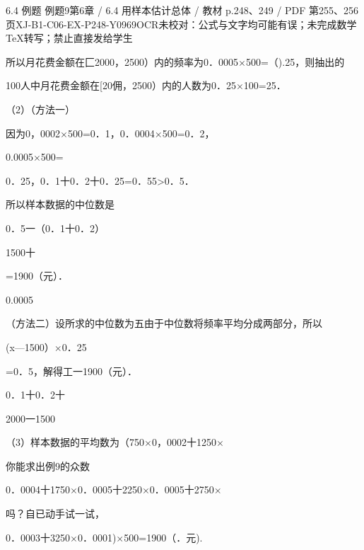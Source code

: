 \begin{bankitem}{6.4 例题 例题9}{第6章 / 6.4 用样本估计总体 / 教材 p.248、249 / PDF 第255、256页}{XJ-B1-C06-EX-P248-Y0969}{OCR未校对：公式与文字均可能有误；未完成数学TeX转写；禁止直接发给学生}
\begin{ocrdraft}
所以月花费金额在匚2000，2500）内的频率为0．0005\ensuremath{\times}500=（).25，则抽出的
\par
100人中月花费金额在[20佣，2500）内的人数为0．25\ensuremath{\times}100=25．
\par
（2）（方法一）
\par
因为0，0002\ensuremath{\times}500=0．1，0．0004\ensuremath{\times}500=0．2，
\par
0.0005\ensuremath{\times}500=
\par
0．25，0．1十0．2十0．25=0．55>0．5．
\par
所以样本数据的中位数是
\par
0．5一（0．1十0．2）
\par
1500十
\par
=1900（元）．
\par
0.0005
\par
（方法二）设所求的中位数为五由于中位数将频率平均分成两部分，所以
\par
(x—1500）\ensuremath{\times}0．25
\par
=0．5，解得工一1900（元）．
\par
0．1十0．2十
\par
2000一1500
\par
（3）样本数据的平均数为（750\ensuremath{\times}0，0002十1250\ensuremath{\times}
\par
你能求出例9的众数
\par
0．0004十1750\ensuremath{\times}0．0005十2250\ensuremath{\times}0．0005十2750\ensuremath{\times}
\par
吗？自已动手试一试，
\par
0．0003十3250\ensuremath{\times}0．0001)\ensuremath{\times}500=1900（．元).
\end{ocrdraft}
\end{bankitem}
